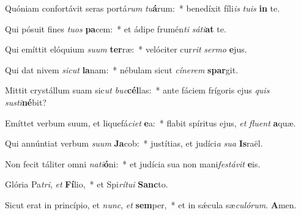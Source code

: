 ﻿\setcounter{versecount}{2}

\vs Quóniam confortávit seras port\-á\-\textit{rum} \textit{tu}\textbf{á}rum:~* benedíxit fíli\textit{is} \textit{tu}\textit{is} \textbf{in} te.

\vs Qui pósuit fines \textit{tu}\textit{os} \textbf{pa}cem:~* et ádipe frumén\textit{ti} \textit{sá}\textit{ti}\textbf{at} te.

\vs Qui emíttit elóquium \textit{su}\textit{um} \textbf{ter}ræ:~* velóciter cur\textit{rit} \textit{ser}\textit{mo} \textbf{e}jus.

\vs Qui dat nivem \textit{sic}\textit{ut} \textbf{la}nam:~* nébulam sicut \textit{cí}\textit{ne}\textit{rem} \textbf{spar}git.

\vs Mittit crystállum suam sic\textit{ut} \textit{buc}\-\textbf{cél}\-las:~* ante fáciem frígoris ejus \textit{quis} \textit{sus}\-\textit{ti}\-\textbf{né}\-bit?

\vs Emíttet verbum suum, et liquefá\textit{ci}\textit{et} \textbf{e}a:~* flabit spíritus ejus, \textit{et} \textit{flu}\textit{ent} \textbf{a}quæ.

\vs Qui annúntiat verbum \textit{su}\textit{um} \textbf{Ja}\-cob:~* justítias, et judíci\textit{a} \textit{su}\textit{a} \textbf{Is}raël.

\vs Non fecit táliter omni \textit{na}\textit{ti}\textbf{ó}ni:~* et judícia sua non mani\textit{fes}\textit{tá}\textit{vit} \textbf{e}is.

\vs Glória Pa\textit{tri}, \textit{et} \textbf{Fí}lio,~* et Spi\textit{rí}\textit{tu}\textit{i} \textbf{Sanc}to.

\vs Sicut erat in princípio, et \textit{nunc}, \textit{et} \textbf{sem}per,~* et in sǽcula sæ\textit{cu}\textit{ló}\textit{rum}. \textbf{A}men.

